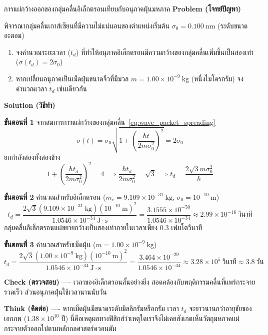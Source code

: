 \begin{psctbox}{การแผ่กว้างออกของกลุ่มคลื่นอิเล็กตรอนเทียบกับอนุภาคฝุ่นมหภาค}
\textbf{Problem (โจทย์ปัญหา)}

พิจารณากลุ่มคลื่นเกาส์เซียนที่มีความไม่แน่นอนของตำแหน่งเริ่มต้น $\sigma_0 = 0.100~\text{nm}$ (ระดับขนาดอะตอม)
\begin{enumerate}
    \item จงคำนวณระยะเวลา ($t_d$) ที่ทำให้อนุภาคอิเล็กตรอนมีความกว้างของกลุ่มคลื่นเพิ่มขึ้นเป็นสองเท่า ($\sigma(t_d) = 2\sigma_0$)
    \item หากเปลี่ยนอนุภาคเป็นเม็ดฝุ่นขนาดจิ๋วที่มีมวล $m = 1.00 \times 10^{-9}~\text{kg}$ (หนึ่งไมโครกรัม) จงคำนวณเวลา $t_d$ เช่นเดียวกัน
\end{enumerate}

\textbf{Solution (วิธีทำ)}

\textbf{ขั้นตอนที่ 1} จากสมการการแผ่กว้างของกลุ่มคลื่น~\eqref{eq:wave_packet_spreading}
\begin{equation*}
\sigma(t) = \sigma_0 \sqrt{1 + \left( \frac{\hbar t}{2 m \sigma_0^2} \right)^2} = 2\sigma_0
\end{equation*}
ยกกำลังสองทั้งสองข้าง
\begin{equation*}
1 + \left( \frac{\hbar t_d}{2 m \sigma_0^2} \right)^2 = 4 \implies \frac{\hbar t_d}{2 m \sigma_0^2} = \sqrt{3} \implies t_d = \frac{2\sqrt{3} m \sigma_0^2}{\hbar}
\end{equation*}

\textbf{ขั้นตอนที่ 2} คำนวณสำหรับอิเล็กตรอน ($m_e = 9.109 \times 10^{-31}~\text{kg}$, $\sigma_0 = 10^{-10}~\text{m}$)
\begin{equation*}
t_d = \frac{2\sqrt{3}(9.109 \times 10^{-31}~\text{kg})(10^{-10}~\text{m})^2}{1.0546 \times 10^{-34}~\text{J}\cdot\text{s}} = \frac{3.1555 \times 10^{-50}}{1.0546 \times 10^{-34}} \approx 2.99 \times 10^{-16}~\text{วินาที}
\end{equation*}
กลุ่มคลื่นอิเล็กตรอนแผ่ขยายกว้างเป็นสองเท่าภายในเวลาเพียง $0.3$ เฟมโตวินาที

\textbf{ขั้นตอนที่ 3} คำนวณสำหรับเม็ดฝุ่น ($m = 1.00 \times 10^{-9}~\text{kg}$)
\begin{equation*}
t_d = \frac{2\sqrt{3}(1.00 \times 10^{-9}~\text{kg})(10^{-10}~\text{m})^2}{1.0546 \times 10^{-34}~\text{J}\cdot\text{s}} = \frac{3.464 \times 10^{-29}}{1.0546 \times 10^{-34}} \approx 3.28 \times 10^{5}~\text{วินาที} \approx 3.8~\text{วัน}
\end{equation*}

\textbf{Check (ตรวจสอบ)} ---- เวลาของอิเล็กตรอนสั้นอย่างยิ่ง สอดคล้องกับพฤติกรรมคลื่นที่แพร่กระจายรวดเร็ว ส่วนอนุภาคฝุ่นใช้เวลานานนับวัน

\textbf{Think (คิดต่อ)} ---- หากเม็ดฝุ่นมีขนาดระดับมิลลิกรัมหรือกรัม เวลา $t_d$ จะยาวนานกว่าอายุขัยของเอกภพ ($1.38 \times 10^{10}$ ปี) นี่คือเหตุผลทางฟิสิกส์ว่าเหตุใดเราจึงไม่เคยสังเกตเห็นวัตถุมหภาคแผ่กระจายตัวออกไปตามหลักกลศาสตร์ควอนตัม
\end{psctbox}

